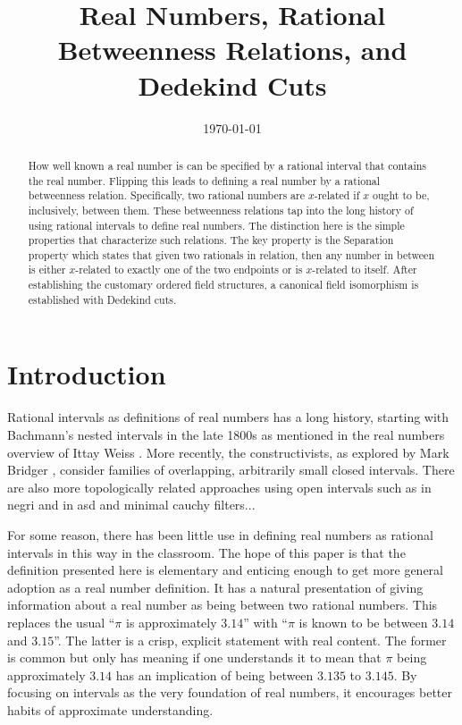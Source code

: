 \documentclass[12pt]{article}
\title{Real Numbers, Rational Betweenness Relations, and Dedekind Cuts}
\date{\today}
\begin{document}
\maketitle
\begin{abstract}
How well known a real number is can be specified by a rational interval that contains the real number. Flipping this leads to defining a real number by a rational betweenness relation. Specifically, two rational numbers are $x$-related if $x$ ought to be, inclusively, between them. These betweenness relations tap into the long history of using rational intervals to define real numbers. The distinction here is the simple properties that characterize such relations. The key property is the Separation property which states that given two rationals in relation, then any number in between is either $x$-related to exactly one of the two endpoints or is $x$-related to itself. After establishing the customary ordered field structures, a canonical field isomorphism is established with Dedekind cuts. 
\end{abstract}

\section{Introduction}

Rational intervals as definitions of real numbers has a long history, starting with Bachmann's nested intervals in the late 1800s as mentioned in the real numbers overview of Ittay Weiss \cite{ittay-2015}. More recently, the constructivists, as explored by Mark Bridger \cite{bridger}, consider families of overlapping, arbitrarily small closed intervals. There are also more topologically related approaches using open intervals such as in negri and in asd and minimal cauchy filters...

For some reason, there has been little use in defining real numbers as rational intervals in this way in the classroom. The hope of this paper is that the definition presented here is elementary and enticing enough to get more general adoption as a real number definition. It has a natural presentation of giving information about a real number as being between two rational numbers. This replaces the usual ``$\pi$
is approximately $3.14$'' with ``$\pi$ is known to be between $3.14$ and $3.15$''.  The latter is a crisp, explicit statement with real content. The former is common but only has meaning if one understands it to mean that $\pi$ being approximately $3.14$ has an implication of being between $3.135$ to $3.145$. By focusing on intervals as the very foundation of real numbers, it encourages better habits of approximate understanding. 
\end{document}
